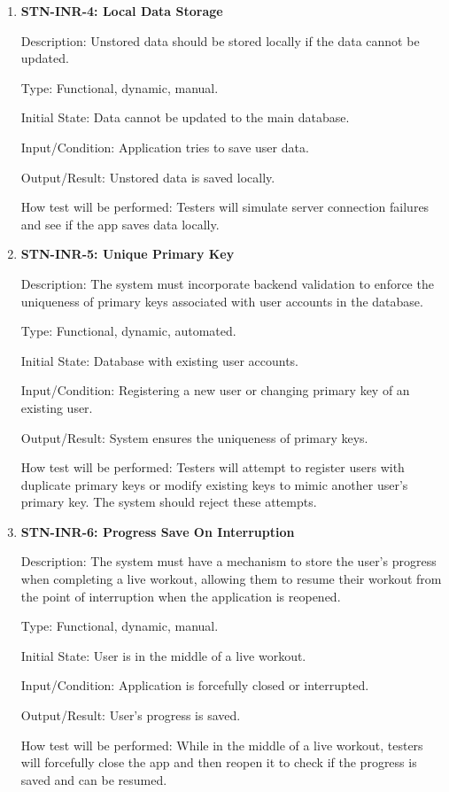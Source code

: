 \documentclass[12pt, titlepage]{article}
\begin{document}
\begin{enumerate}
\item{\textbf{STN-INR-4: Local Data Storage}}

Description: Unstored data should be stored locally if the data cannot be updated.

Type: Functional, dynamic, manual.

Initial State: Data cannot be updated to the main database.

Input/Condition: Application tries to save user data.

Output/Result: Unstored data is saved locally.

How test will be performed: Testers will simulate server connection failures and see if the app saves data locally.


\item{\textbf{STN-INR-5: Unique Primary Key}}

Description: The system must incorporate backend validation to enforce the uniqueness of primary keys associated with user accounts in the database. 

Type: Functional, dynamic, automated.

Initial State: Database with existing user accounts.

Input/Condition: Registering a new user or changing primary key of an existing user.

Output/Result: System ensures the uniqueness of primary keys.

How test will be performed: Testers will attempt to register users with duplicate primary keys or modify existing keys to mimic another user's primary key. The system should reject these attempts.

\item{\textbf{STN-INR-6: Progress Save On Interruption}}

Description: The system must have a mechanism to store the user’s progress when completing a live workout, allowing them to resume their workout from the point of interruption when the application is reopened.

Type: Functional, dynamic, manual.

Initial State: User is in the middle of a live workout.

Input/Condition: Application is forcefully closed or interrupted.

Output/Result: User's progress is saved.

How test will be performed: While in the middle of a live workout, testers will forcefully close the app and then reopen it to check if the progress is saved and can be resumed.



\end{enumerate}
\end{document}
